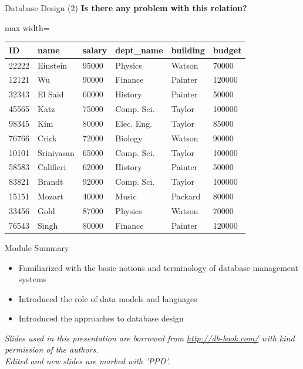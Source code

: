 \documentclass[aspectratio=169, xcolor=dvipsnames]{beamer}
\begin{document}
\begin{frame}{Database Design (2)}
    \textbf{Is there any problem with this relation?}
    \vspace{0.5em}
    \begin{center}
        \begin{adjustbox}{max width=\textwidth}
        \begin{tabular}{|l|l|l|l|l|l|}
        \hline
        \textbf{ID} & \textbf{name} & \textbf{salary} & \textbf{dept\_name} & \textbf{building} & \textbf{budget} \\ \hline
        22222 & Einstein & 95000 & Physics & Watson & 70000 \\ \hline
        12121 & Wu & 90000 & Finance & Painter & 120000 \\ \hline
        32343 & El Said & 60000 & History & Painter & 50000 \\ \hline
        45565 & Katz & 75000 & Comp. Sci. & Taylor & 100000 \\ \hline
        98345 & Kim & 80000 & Elec. Eng. & Taylor & 85000 \\ \hline
        76766 & Crick & 72000 & Biology & Watson & 90000 \\ \hline
        10101 & Srinivasan & 65000 & Comp. Sci. & Taylor & 100000 \\ \hline
        58583 & Califieri & 62000 & History & Painter & 50000 \\ \hline
        83821 & Brandt & 92000 & Comp. Sci. & Taylor & 100000 \\ \hline
        15151 & Mozart & 40000 & Music & Packard & 80000 \\ \hline
        33456 & Gold & 87000 & Physics & Watson & 70000 \\ \hline
        76543 & Singh & 80000 & Finance & Painter & 120000 \\ \hline
        \end{tabular}
        \end{adjustbox}
    \end{center}
\end{frame}

\begin{frame}{Module Summary}
    \begin{itemize}
        \item Familiarized with the basic notions and terminology of database management systems
        \item Introduced the role of data models and languages
        \item Introduced the approaches to database design
    \end{itemize}
    
    \vspace{2em}
    \begin{center}
    \small \textit{Slides used in this presentation are borrowed from \url{http://db-book.com/} with kind permission of the authors.} \\
    \small \textit{Edited and new slides are marked with 'PPD'.}
    \end{center}
\end{frame}
\end{document}
